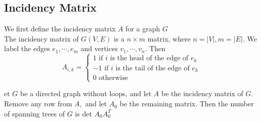 \documentclass[12pt]{article}
\newenvironment{theorem}[2][Theorem]{\begin{trivlist}
\item[\hskip \labelsep {\bfseries #1}\hskip \labelsep {\bfseries #2.}]}{\end{trivlist}}
\begin{document}
\subsection{Incidency Matrix}We first define the incidency matrix $A$ for a graph $G$\\
\newline
The incidency matrix of $G(V, E)$ is a  $n \times m$ matrix, where $n = |V|, m = |E|$. We label the edges $e_1, \cdots, e_m$ and vertices $v_1, \cdots, v_n$. Then
$$A_{i, k} = \begin{cases}
1 \text{ if }i \text{ is the head of the edge of } e_k\\
-1 \text{ if }i \text{ is the tail of the edge of } e_k\\
0 \text{ otherwise}
\end{cases}$$

\begin{theorem}
	Let $G$ be a directed graph without loops, and let $A$ be
	the incidency matrix of $G .$ Remove any row from $A ,$ and let $A _ { 0 }$ be the
	remaining matrix. Then the number of spanning trees of $G$ is det $A _ { 0 } A _ { 0 } ^ { T }$
\end{theorem}
\end{document}
